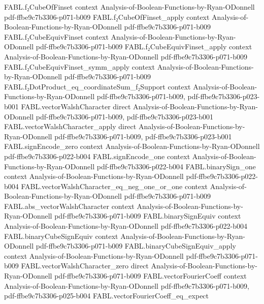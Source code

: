 \begin{theorem}
  {FABL.f₂CubeOfFinset}
  {context}
  {Analysis-of-Boolean-Functions-by-Ryan-ODonnell}
  {pdf-ffbe9c7b3306-p071-b009}
\proofstep
  {FABL.f₂CubeOfFinset_apply}
  {context}
  {Analysis-of-Boolean-Functions-by-Ryan-ODonnell}
  {pdf-ffbe9c7b3306-p071-b009}
\proofstep
  {FABL.f₂CubeEquivFinset}
  {context}
  {Analysis-of-Boolean-Functions-by-Ryan-ODonnell}
  {pdf-ffbe9c7b3306-p071-b009}
\proofstep
  {FABL.f₂CubeEquivFinset_apply}
  {context}
  {Analysis-of-Boolean-Functions-by-Ryan-ODonnell}
  {pdf-ffbe9c7b3306-p071-b009}
\proofstep
  {FABL.f₂CubeEquivFinset_symm_apply}
  {context}
  {Analysis-of-Boolean-Functions-by-Ryan-ODonnell}
  {pdf-ffbe9c7b3306-p071-b009}
\proofstep
  {FABL.f₂DotProduct_eq_coordinateSum_f₂Support}
  {context}
  {Analysis-of-Boolean-Functions-by-Ryan-ODonnell}
  {pdf-ffbe9c7b3306-p071-b009,
    pdf-ffbe9c7b3306-p023-b001}
\proofstep
  {FABL.vectorWalshCharacter}
  {direct}
  {Analysis-of-Boolean-Functions-by-Ryan-ODonnell}
  {pdf-ffbe9c7b3306-p071-b009,
    pdf-ffbe9c7b3306-p023-b001}
\proofstep
  {FABL.vectorWalshCharacter_apply}
  {direct}
  {Analysis-of-Boolean-Functions-by-Ryan-ODonnell}
  {pdf-ffbe9c7b3306-p071-b009,
    pdf-ffbe9c7b3306-p023-b001}
\proofstep
  {FABL.signEncode_zero}
  {context}
  {Analysis-of-Boolean-Functions-by-Ryan-ODonnell}
  {pdf-ffbe9c7b3306-p022-b004}
\proofstep
  {FABL.signEncode_one}
  {context}
  {Analysis-of-Boolean-Functions-by-Ryan-ODonnell}
  {pdf-ffbe9c7b3306-p022-b004}
\proofstep
  {FABL.binarySign_one}
  {context}
  {Analysis-of-Boolean-Functions-by-Ryan-ODonnell}
  {pdf-ffbe9c7b3306-p022-b004}
\proofstep
  {FABL.vectorWalshCharacter_eq_neg_one_or_one}
  {context}
  {Analysis-of-Boolean-Functions-by-Ryan-ODonnell}
  {pdf-ffbe9c7b3306-p071-b009}
\proofstep
  {FABL.abs_vectorWalshCharacter}
  {context}
  {Analysis-of-Boolean-Functions-by-Ryan-ODonnell}
  {pdf-ffbe9c7b3306-p071-b009}
\proofstep
  {FABL.binarySignEquiv}
  {context}
  {Analysis-of-Boolean-Functions-by-Ryan-ODonnell}
  {pdf-ffbe9c7b3306-p022-b004}
\proofstep
  {FABL.binaryCubeSignEquiv}
  {context}
  {Analysis-of-Boolean-Functions-by-Ryan-ODonnell}
  {pdf-ffbe9c7b3306-p071-b009}
\proofstep
  {FABL.binaryCubeSignEquiv_apply}
  {context}
  {Analysis-of-Boolean-Functions-by-Ryan-ODonnell}
  {pdf-ffbe9c7b3306-p071-b009}
\proofstep
  {FABL.vectorWalshCharacter_zero}
  {direct}
  {Analysis-of-Boolean-Functions-by-Ryan-ODonnell}
  {pdf-ffbe9c7b3306-p071-b009}
\proofstep
  {FABL.vectorFourierCoeff}
  {context}
  {Analysis-of-Boolean-Functions-by-Ryan-ODonnell}
  {pdf-ffbe9c7b3306-p071-b009,
    pdf-ffbe9c7b3306-p025-b004}
\proofstep
  {FABL.vectorFourierCoeff_eq_expect}

\end{theorem}
